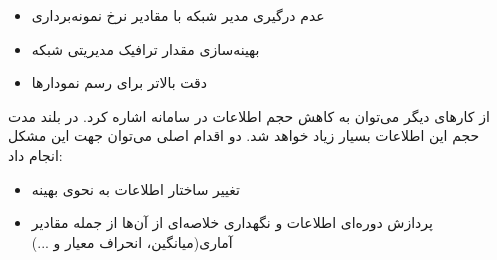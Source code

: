 \begin{itemize}
    \item عدم درگیری مدیر شبکه با مقادیر نرخ نمونه‌برداری
    \item بهینه‌سازی مقدار ترافیک مدیریتی شبکه
    \item دقت بالاتر برای رسم نمودارها
\end{itemize}


از کارهای دیگر می‌توان به کاهش حجم اطلاعات در سامانه اشاره کرد. در بلند مدت حجم این اطلاعات بسیار زیاد خواهد شد. دو اقدام اصلی می‌توان جهت این مشکل انجام داد:

\begin{itemize}
    \item تغییر ساختار اطلاعات به نحوی بهینه
    \item پردازش دوره‌ای اطلاعات و نگهداری خلاصه‌ای از آن‌ها از جمله مقادیر آماری(میانگین، انحراف معیار و ...)
\end{itemize}